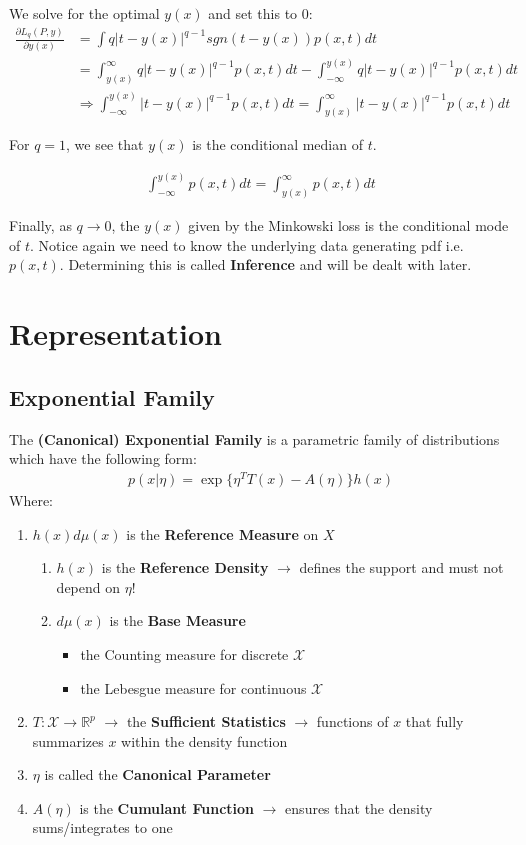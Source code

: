 \documentclass[]{article}
\theoremstyle{mattstyle}
\theoremstyle{definition}
\begin{document}
We solve for the optimal $y(x)$ and set this to 0:
\begin{align}
\frac{\partial L_q(P,y)}{\partial y(x)} &= \int q|t-y(x)|^{q-1} sgn(t-y(x)) p(x,t)dt\\
&= \int_{y(x)}^{\infty} q|t-y(x)|^{q-1}p(x,t)dt-\int_{-\infty}^{y(x)} q|t-y(x)|^{q-1}p(x,t)dt\\
&\Rightarrow \int_{-\infty}^{y(x)} |t-y(x)|^{q-1}p(x,t)dt = \int_{y(x)}^{\infty} |t-y(x)|^{q-1}p(x,t)dt
\end{align}

For $q=1$, we see that $y(x)$ is the conditional median of $t$.

\begin{align}
\int_{-\infty}^{y(x)} p(x,t)dt = \int_{y(x)}^{\infty} p(x,t)dt
\end{align}

Finally, as $q \rightarrow 0$, the $y(x)$ given by the Minkowski loss is the conditional mode of $t$. Notice again we need to know the underlying data generating pdf i.e. $p(x, t)$. Determining this is called \textbf{Inference} and will be dealt with later.

\newpage

\section{Representation}

\subsection{Exponential Family}\label{sec:expfam}

The \textbf{(Canonical) Exponential Family} is a parametric family of distributions which have the following form:
\begin{align}
p(x|\eta) = \exp\{ \eta^TT(x) - A(\eta)\}h(x)
\end{align}
Where:
\begin{enumerate}
	\item $h(x)d\mu(x)$ is the \textbf{Reference Measure} on $X$
	\begin{enumerate}
		\item $h(x)$ is the \textbf{Reference Density} $\rightarrow$ defines the support and must not depend on $\eta$!
		\item $d\mu(x)$ is the \textbf{Base Measure} 
		\begin{itemize}
			\item the Counting measure for discrete $\mathcal{X}$
			\item the Lebesgue measure for continuous $\mathcal{X}$
		\end{itemize}
	\end{enumerate}
	\item $T: \mathcal{X} \rightarrow \mathbb{R}^p$ $\rightarrow$ the \textbf{Sufficient Statistics} $\rightarrow$ functions of $x$ that fully summarizes $x$ within the density function
	\item $\eta$ is called the \textbf{Canonical Parameter}
	\item $A(\eta)$ is the \textbf{Cumulant Function} $\rightarrow$ ensures that the density sums/integrates to one
\end{enumerate}
\end{document}
